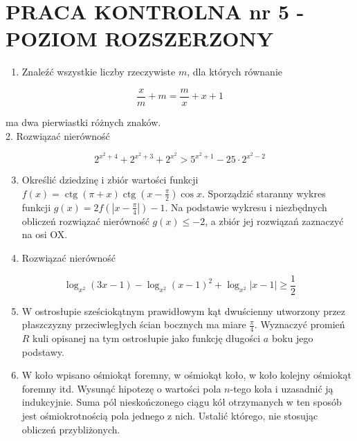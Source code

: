 \documentclass[10pt]{article}
\begin{document}
\section*{PRACA KONTROLNA nr 5 - POZIOM ROZSZERZONY}
\begin{enumerate}
  \item Znaleźć wszystkie liczby rzeczywiste $m$, dla których równanie
\end{enumerate}

$$
\frac{x}{m}+m=\frac{m}{x}+x+1
$$

ma dwa pierwiastki różnych znaków.\\
2. Rozwiązać nierówność

$$
2^{x^{2}+4}+2^{x^{2}+3}+2^{x^{2}}>5^{x^{2}+1}-25 \cdot 2^{x^{2}-2}
$$

\begin{enumerate}
  \setcounter{enumi}{2}
  \item Określić dziedzinę i zbiór wartości funkcji $f(x)=\operatorname{ctg}(\pi+x) \operatorname{ctg}\left(x-\frac{\pi}{2}\right) \cos x$. Sporządzić staranny wykres funkcji $g(x)=2 f\left(\left|x-\frac{\pi}{4}\right|\right)-1$. Na podstawie wykresu i niezbędnych obliczeń rozwiązać nierówność $g(x) \leqslant-2$, a zbiór jej rozwiązań zaznaczyć na osi OX.
  \item Rozwiązać nierówność
\end{enumerate}

$$
\log _{x^{2}}(3 x-1)-\log _{x^{2}}(x-1)^{2}+\log _{x^{2}}|x-1| \geqslant \frac{1}{2}
$$

\begin{enumerate}
  \setcounter{enumi}{4}
  \item W ostrosłupie sześciokątnym prawidłowym kąt dwuścienny utworzony przez płaszczyzny przeciwległych ścian bocznych ma miare $\frac{\pi}{4}$. Wyznaczyć promień $R$ kuli opisanej na tym ostrosłupie jako funkcję długości $a$ boku jego podstawy.
  \item W koło wpisano ośmiokąt foremny, w ośmiokąt koło, w koło kolejny ośmiokąt foremny itd. Wysunąć hipotezę o wartości pola $n$-tego koła i uzasadnić ją indukcyjnie. Suma pól nieskończonego ciągu kół otrzymanych w ten sposób jest ośmiokrotnością pola jednego z nich. Ustalić którego, nie stosując obliczeń przybliżonych.
\end{enumerate}
\end{document}
